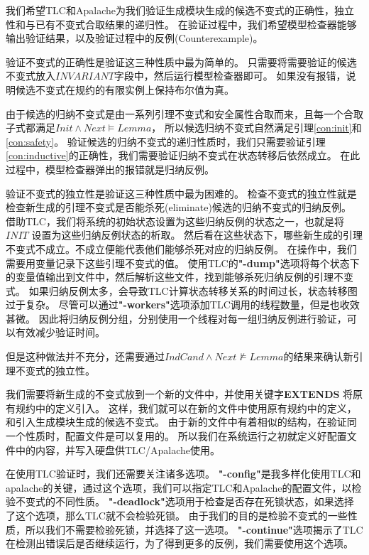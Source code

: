 我们希望TLC和Apalache为我们验证生成模块生成的候选不变式的正确性，独立性和与已有不变式合取结果的递归性。
在验证过程中，我们希望模型检查器能够输出验证结果，以及验证过程中的反例(Counterexample)。

验证不变式的正确性是验证这三种性质中最为简单的。
只需要将需要验证的候选不变式放入$INVARIANT$字段中，然后运行模型检查器即可。
如果没有报错，说明候选不变式在规约的有限实例上保持布尔值为真。

由于候选的归纳不变式是由一系列引理不变式和安全属性合取而来，且每一个合取子式都满足$Init \wedge Next \vDash Lemma$，
所以候选归纳不变式自然满足引理\ref{con:init}和\ref{con:safety}。
验证候选的归纳不变式的递归性质时，我们只需要验证引理\ref{con:inductive}的正确性，我们需要验证归纳不变式在状态转移后依然成立。
在此过程中，模型检查器弹出的报错就是归纳反例。

验证不变式的独立性是验证这三种性质中最为困难的。
检查不变式的独立性就是检查新生成的引理不变式是否能杀死(eliminate)候选的归纳不变式的归纳反例。
借助TLC，我们将系统的初始状态设置为这些归纳反例的状态之一，也就是将$INIT$ 设置为这些归纳反例状态的析取。
然后看在这些状态下，哪些新生成的引理不变式不成立。不成立便能代表他们能够杀死对应的归纳反例。
在操作中，我们需要用变量记录下这些引理不变式的值。
使用TLC的\textbf{"-dump"}选项将每个状态下的变量值输出到文件中，然后解析这些文件，找到能够杀死归纳反例的引理不变式。
如果归纳反例太多，会导致TLC计算状态转移关系的时间过长，状态转移图过于复杂。
尽管可以通过\textbf{"-workers"}选项添加TLC调用的线程数量，但是也收效甚微。
因此将归纳反例分组，分别使用一个线程对每一组归纳反例进行验证，可以有效减少验证时间。

但是这种做法并不充分，还需要通过$IndCand \wedge Next \nvDash Lemma$的结果来确认新引理不变式的独立性。

我们需要将新生成的不变式放到一个新的文件中，并使用关键字\textbf{EXTENDS} 将原有规约中的定义引入。
这样，我们就可以在新的文件中使用原有规约中的定义，和引入生成模块生成的候选不变式。
由于新的\TLA 文件中有着相似的结构，在验证同一个性质时，配置文件是可以复用的。
所以我们在系统运行之初就定义好配置文件中的内容，并写入硬盘供TLC/Apalache使用。

在使用TLC验证时，我们还需要关注诸多选项。
\textbf{"-config"}是我多样化使用TLC和apalache的关键，通过这个选项，我们可以指定TLC和Apalache的配置文件，以检验不变式的不同性质。
\textbf{"-deadlock"}选项用于检查是否存在死锁状态，如果选择了这个选项，那么TLC就不会检验死锁。
由于我们的目的是检验不变式的一些性质，所以我们不需要检验死锁，并选择了这一选项。
\textbf{"-continue"}选项揭示了TLC在检测出错误后是否继续运行，为了得到更多的反例，我们需要使用这个选项。

